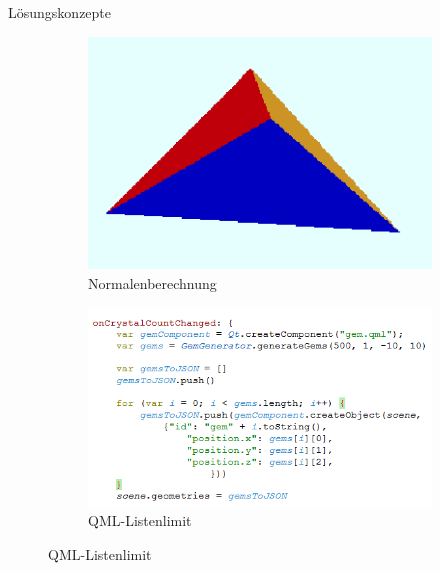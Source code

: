 \slideonetoone
{Lösungskonzepte}
{	
	\begin{figure}
		\centering
		\begin{subfigure}{\textwidth}
			\centering
			\includegraphics[width=\textwidth, height=0.3\textheight, keepaspectratio]{images/nogeometry2}
			\caption{Normalenberechnung}
		\end{subfigure}
		\begin{subfigure}{\textwidth}
			\centering
			\includegraphics[width=\textwidth, height=0.3\textheight, keepaspectratio]{images/60max2}
			\caption{QML-Listenlimit}
		\end{subfigure}
	\end{figure}
}
